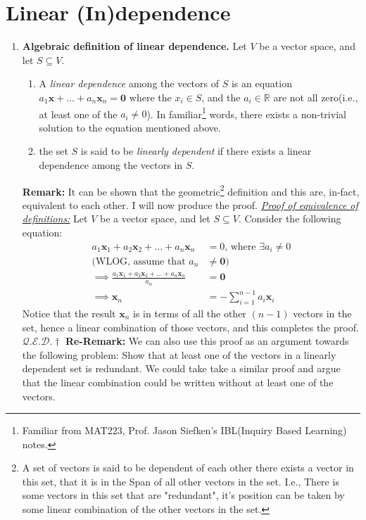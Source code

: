 \documentclass[oneside, 12pt]{book}
\newcommand{\settag}[1]{\renewcommand{\theenumi}{#1}}
\newcommand{\R}{\mathbb{R}}
\newcommand{\qed}{\hfill $\mathcal{Q}.\mathcal{E}.\mathcal{D}.\dagger$}
\newcommand{\tbf}[1]{\textbf{#1}}
\newcommand{\tit}[1]{\textit{#1}}
\newcommand{\vzero}{\mathbf{0}}
\begin{document}
\section{Linear (In)dependence}
    \begin{enumerate}
        \settag{1.4.2}
        \item \textbf{Algebraic definition of linear dependence.} Let $V$ be a vector space, and let $S\subseteq V$.
            \begin{enumerate}
                \item A \textit{linear dependence} among the vectors of $S$ is an equation $a_1\mathbf{x} + \ldots + a_n\mathbf{x}_n = \vzero$ where the $x_i\in S$, and the $a_i\in \R$ are not all zero(i.e., at least one of the $a_i\neq 0$). In familiar\footnote{Familiar from MAT223, Prof. Jason Siefken's IBL(Inquiry Based Learning) notes.} words, there exists a non-trivial solution to the equation mentioned above.
                \item the set $S$ is said to be \textit{linearly dependent} if there exists a linear dependence among the vectors in $S$.
            \end{enumerate}
            \tbf{Remark: }It can be shown that the geometric\footnote{A set of vectors is said to be dependent of each other there exists a vector in this set, that it is in the Span of all other vectors in the set. I.e., There is some vectors in this set that are "redundant", it's position can be taken by some linear combination of the other vectors in the set.} definition and this are, in-fact, equivalent to each other. I will now produce the proof. \newline
        \tit{\underline{Proof of equivalence of definitions:}} \newline
        Let $V$ be a vector space, and let $S\subseteq V$. Consider the following equation:
        \begin{align*}
            a_1\mathbf{x}_1 + a_2\mathbf{x}_2 + \ldots + a_n\mathbf{x}_n &= 0\text{, where } \exists a_i\neq 0 \\
            \text{(WLOG, assume that } a_n &\neq \vzero\text{)}\\
            \implies \frac{a_1\mathbf{x}_1 + a_2\mathbf{x}_2 + \ldots + a_n\mathbf{x}_n}{a_n}&=\vzero\\
            \implies \mathbf{x}_n &= -\sum_{i=1}^{n-1}a_i\mathbf{x}_i
        \end{align*}
        Notice that the result $\mathbf{x}_n$ is in terms of all the other $(n-1)$ vectors in the set, hence a linear combination of those vectors, and this completes the proof.
        \qed\newline
        \textbf{Re-Remark: }We can also use this proof as an argument towards the following problem: Show that at least one of the vectors in a linearly dependent set is redundant. We could take take a similar proof and argue that the linear combination could be written without at least one of the vectors.
        

\end{enumerate}
\end{document}
